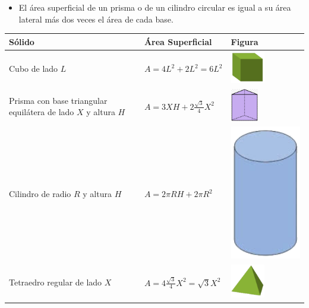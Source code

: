 \documentclass[12pt,a4paper]{article}
\begin{document}
\begin{tcolorbox}[colback=fondoazul, colframe=azuloscuro, title=\textbf{RECUERDA QUE...}, breakable]
\begin{itemize}[nosep]
    \item El área superficial de un prisma o de un cilindro circular es igual a su área lateral más dos veces el área de cada base.
\end{itemize}

\begin{center}
\small
\begin{tabular}{|
		>{\centering\arraybackslash}m{4.5cm}|
		>{\centering\arraybackslash}m{4.5cm}|
		>{\centering\arraybackslash}m{2.5cm}|}
\hline
\textbf{Sólido} & \textbf{Área Superficial} & \textbf{Figura} \\
\hline
Cubo de lado $L$ & $A = 4L^2 + 2L^2 = 6L^2$ & \includegraphics[width=1.5cm]{Figuras/fig44.png} \\
\hline
Prisma con base triangular equilátera de lado $X$ y altura $H$ & $A = 3XH + 2\frac{\sqrt{3}}{4}X^2$ & \includegraphics[width=1.2cm]{Figuras/fig82b.png} \\
\hline
Cilindro de radio $R$ y altura $H$ & $A = 2\pi RH + 2\pi R^2$ & \includegraphics[width=.8cm]{Figuras/fig5.png} \\
\hline
Tetraedro regular de lado $X$ & $A = 4\frac{\sqrt{3}}{4}X^2 = \sqrt{3}X^2$ & \includegraphics[width=1.5cm]{Figuras/fig43.png} \\
\hline
\end{tabular}
\end{center}
\end{tcolorbox}
\end{document}

